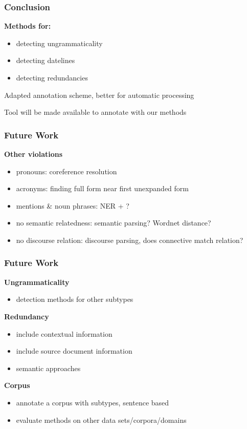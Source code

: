 \documentclass[table]{beamer}
\begin{document}
\begin{frame}
  \frametitle{Conclusion}
  \textbf{Methods for:}
  \begin{itemize}
    \item detecting ungrammaticality
    \item detecting datelines
    \item detecting redundancies
  \end{itemize}\pause

  \vspace{0.5cm}
  Adapted annotation scheme, better for automatic processing\pause

  \vspace{0.5cm}
  Tool will be made available to annotate with our methods
\end{frame}

\begin{frame}
  \frametitle{Future Work}
  \textbf{Other violations}
  \begin{itemize}
    \item pronouns: coreference resolution
    \item acronyms: finding full form near first unexpanded form
    \item mentions \& noun phrases: NER + ?
    \item no semantic relatedness: semantic parsing? Wordnet distance?
    \item no discourse relation: discourse parsing, does connective match relation?
  \end{itemize}
\end{frame}

\begin{frame}
  \frametitle{Future Work}
  \textbf{Ungrammaticality}
  \begin{itemize}
    \item detection methods for other subtypes
  \end{itemize}\pause
  \vspace{0.5cm}
  \textbf{Redundancy}
  \begin{itemize}
    \item include contextual information
    \item include source document information
    \item semantic approaches
  \end{itemize}\pause
  \vspace{0.5cm}
  \textbf{Corpus}
  \begin{itemize}
    \item annotate a corpus with subtypes, sentence based
    \item evaluate methods on other data sets/corpora/domains
  \end{itemize}
\end{frame}
\end{document}

